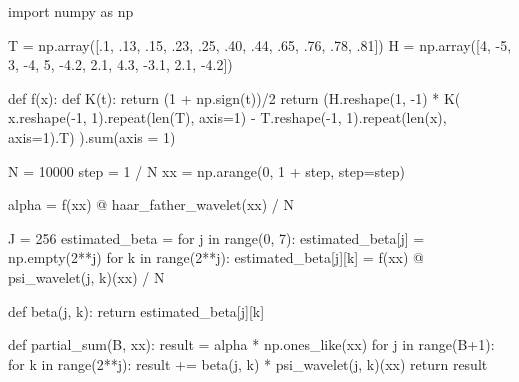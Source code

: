 \begin{python}
import numpy as np

T = np.array([.1, .13, .15, .23, .25, .40, .44, .65, .76, .78, .81])
H = np.array([4, -5, 3, -4, 5, -4.2, 2.1, 4.3, -3.1, 2.1, -4.2])

def f(x):
    def K(t):
        return (1 + np.sign(t))/2
    return (H.reshape(1, -1) * K(
        x.reshape(-1, 1).repeat(len(T), axis=1) - T.reshape(-1, 1).repeat(len(x), axis=1).T)
    ).sum(axis = 1)
\end{python}

\begin{python}
N = 10000
step = 1 / N
xx = np.arange(0, 1 + step, step=step)

alpha = f(xx) @ haar_father_wavelet(xx) / N

J = 256
estimated_beta = {}
for j in range(0, 7):
    estimated_beta[j] = np.empty(2**j)
    for k in range(2**j):
        estimated_beta[j][k] = f(xx) @ psi_wavelet(j, k)(xx) / N
    
def beta(j, k):
    return estimated_beta[j][k]
\end{python}

\begin{python}
def partial_sum(B, xx):
    result = alpha * np.ones_like(xx)
    for j in range(B+1):
        for k in range(2**j):
            result += beta(j, k) * psi_wavelet(j, k)(xx)
    return result
\end{python}


